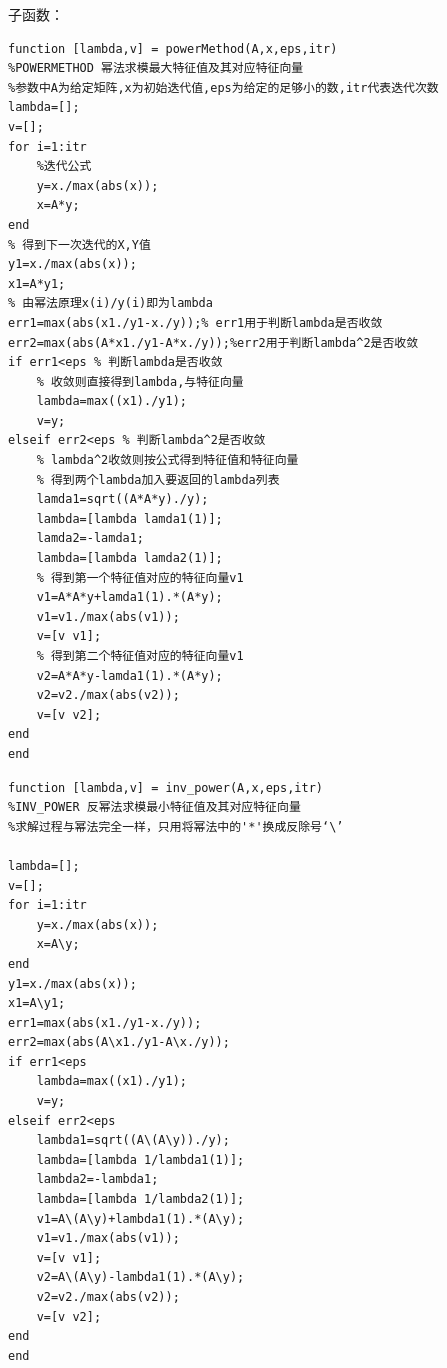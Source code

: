 \documentclass[12pt,a4paper,utf8]{ctexart}
\begin{document}
\begin{enumerate}
子函数：
\begin{lstlisting}[frame=single]
function [lambda,v] = powerMethod(A,x,eps,itr)
%POWERMETHOD 幂法求模最大特征值及其对应特征向量
%参数中A为给定矩阵,x为初始迭代值,eps为给定的足够小的数,itr代表迭代次数
lambda=[];
v=[];
for i=1:itr
    %迭代公式
    y=x./max(abs(x));
    x=A*y;
end
% 得到下一次迭代的X,Y值
y1=x./max(abs(x));
x1=A*y1;
% 由幂法原理x(i)/y(i)即为lambda
err1=max(abs(x1./y1-x./y));% err1用于判断lambda是否收敛
err2=max(abs(A*x1./y1-A*x./y));%err2用于判断lambda^2是否收敛
if err1<eps % 判断lambda是否收敛
    % 收敛则直接得到lambda,与特征向量
    lambda=max((x1)./y1);
    v=y;
elseif err2<eps % 判断lambda^2是否收敛
    % lambda^2收敛则按公式得到特征值和特征向量
    % 得到两个lambda加入要返回的lambda列表
    lamda1=sqrt((A*A*y)./y);
    lambda=[lambda lamda1(1)];
    lamda2=-lamda1;
    lambda=[lambda lamda2(1)];
    % 得到第一个特征值对应的特征向量v1
    v1=A*A*y+lamda1(1).*(A*y);
    v1=v1./max(abs(v1));
    v=[v v1];
    % 得到第二个特征值对应的特征向量v1
    v2=A*A*y-lamda1(1).*(A*y);
    v2=v2./max(abs(v2));
    v=[v v2];
end
end
\end{lstlisting}

\begin{lstlisting}[frame=single]
function [lambda,v] = inv_power(A,x,eps,itr)
%INV_POWER 反幂法求模最小特征值及其对应特征向量
%求解过程与幂法完全一样，只用将幂法中的'*'换成反除号‘\’

lambda=[];
v=[];
for i=1:itr
    y=x./max(abs(x));
    x=A\y;
end
y1=x./max(abs(x));
x1=A\y1;
err1=max(abs(x1./y1-x./y));
err2=max(abs(A\x1./y1-A\x./y));
if err1<eps
    lambda=max((x1)./y1);
    v=y;
elseif err2<eps
    lambda1=sqrt((A\(A\y))./y);
    lambda=[lambda 1/lambda1(1)];
    lambda2=-lambda1;
    lambda=[lambda 1/lambda2(1)];
    v1=A\(A\y)+lambda1(1).*(A\y);
    v1=v1./max(abs(v1));
    v=[v v1];
    v2=A\(A\y)-lambda1(1).*(A\y);
    v2=v2./max(abs(v2));
    v=[v v2];
end
end
\end{lstlisting}

\end{enumerate}
\end{document}
